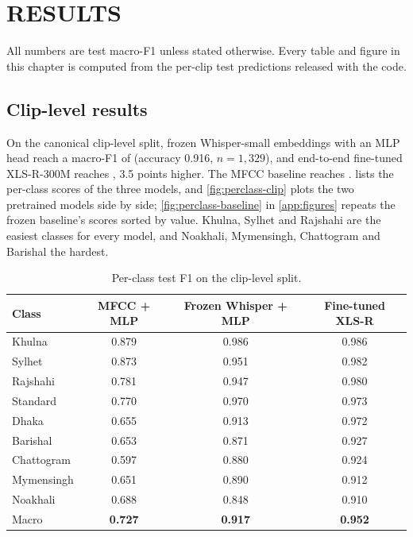 \chapter{RESULTS}
\label{ch:results}

All numbers are test macro-F1 unless stated otherwise. Every table and figure
in this chapter is computed from the per-clip test predictions released with
the code.

\section{Clip-level results}
\label{sec:res-clip}

On the canonical clip-level split, frozen Whisper-small embeddings with an MLP
head reach a macro-F1 of  (accuracy 0.916, $n = 1{,}329$), and
end-to-end fine-tuned XLS-R-300M reaches , 3.5 points higher.
The MFCC baseline reaches .  lists the
per-class scores of the three models, and \cref{fig:perclass-clip} plots the
two pretrained models side by side; \cref{fig:perclass-baseline} in
\cref{app:figures} repeats the frozen baseline's scores sorted by value. Khulna,
Sylhet and Rajshahi are the easiest classes for every model, and Noakhali,
Mymensingh, Chattogram and Barishal the hardest.

\begin{table}[ht]
  \centering
  \caption{Per-class test F1 on the clip-level split.}
  \label{tab:clip-perclass}
  \begin{tabular}{lccc}
    \toprule
    Class & MFCC + MLP & Frozen Whisper + MLP & Fine-tuned XLS-R \\
    \midrule
    Khulna     & 0.879 & 0.986 & 0.986 \\
    Sylhet     & 0.873 & 0.951 & 0.982 \\
    Rajshahi   & 0.781 & 0.947 & 0.980 \\
    Standard   & 0.770 & 0.970 & 0.973 \\
    Dhaka      & 0.655 & 0.913 & 0.972 \\
    Barishal   & 0.653 & 0.871 & 0.927 \\
    Chattogram & 0.597 & 0.880 & 0.924 \\
    Mymensingh & 0.651 & 0.890 & 0.912 \\
    Noakhali   & 0.688 & 0.848 & 0.910 \\
    \midrule
    Macro      & \textbf{0.727} & \textbf{0.917} & \textbf{0.952} \\
    \bottomrule
  \end{tabular}
\end{table}

